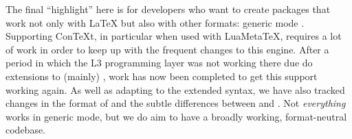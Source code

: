 \documentclass{ltnews}
\begin{document}
The final \enquote{highlight} here is for developers who want to create
packages that work not only with \LaTeX{} but also with other formats: 
generic mode . 
Supporting Con\TeX{}t, in particular when used with
LuaMeta\TeX{}, requires a lot of work in order to keep up with the frequent 
changes to this engine.  After a
period in which the L3 programming layer was not working there due do extensions 
to (mainly) , work has now been completed to get this
support working again. As well as adapting to the extended  syntax,
we have also tracked changes in the format of  and the subtle
differences between  and . Not \emph{everything}
works in generic mode, 
but we do aim to have a broadly working, format-neutral codebase.


\end{document}
